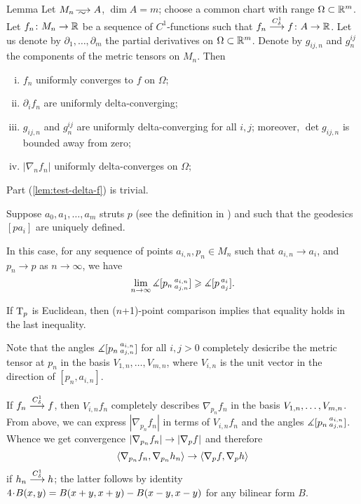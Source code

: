 \begin{thm}{Lemma}\label{lem:test-delta}
Let $M_n\smooths{} A$, $\dim A=m$;
choose a common chart with range $\Omega\subset \mathbb{R}^m$.
Let $f_n\colon M_n\to\mathbb{R}$ be a sequence of $C^1$-functions such that $f_n\zz\smoothto f\:A\to \RR$.
Let us denote by $\partial_1,\dots,\partial_m$ the partial derivatives on $\Omega\subset \mathbb{R}^m$.
Denote by $g_{ij,n}$ and $g^{ij}_n$ the components of the metric tensors on $M_n$.
Then 
\begin{enumerate}[(i)]
\item\label{lem:test-delta-f} $f_n$ uniformly converges to $f$ on $\Omega$;
\item\label{lem:test-delta-partial} $\partial_if_n$ are uniformly delta-converging;
\item\label{lem:test-delta-g}  $g_{ij,n}$ and $g^{ij}_n$ are uniformly delta-converging for all $i,j$;
moreover, $\det g_{ij,n}$ is bounded away from zero;
\item\label{lem:test-delta|nabla|} $|\nabla_n f_n|$ uniformly delta-converges on $\Omega$; %
\end{enumerate}

\end{thm}

Part (\ref{lem:test-delta-f}) is trivial.

Suppose $a_0, a_1,\dots,a_m$ struts $p$ (see the definition in \cite{AKP}) and such that the geodesics $[pa_i]$ are uniquely defined.

In this case, for any sequence of points $a_{i,n}, p_n\in M_n$ such that $a_{i,n}\to a_i$, and $p_n\to p$ as $n\to\infty$, we have
\[\lim_{n\to\infty}\measuredangle [p_n\,{}^{a_{i,n}}_{a_{j,n}}]\geqslant \measuredangle [p\,{}^{a_i}_{a_j}].\]

If $\mathrm{T}_p$ is Euclidean, then ($n$+1)-point comparison implies that equality holds in the last inequality.

Note that the angles $\measuredangle [p_n\,{}^{a_{i,n}}_{a_{j,n}}]$ for all $i,j>0$ completely desicribe the metric tensor at $p_n$ in the basis $V_{1,n},\dots,V_{m,n}$, where $V_{i,n}$ is the unit vector in the direction of $[p_n,a_{i,n}]$.

If $f_n\zz\smoothto f$, then $V_{i,n}f_n$ completely describes $\nabla_{p_n}f_n$ in the basis $V_{1,n},\zz\dots,V_{m,n}$.
From above, we can express $|\nabla_{p_n}f_n|$ in terms of $V_{i,n}f_n$ and the angles $\measuredangle [p_n\,{}^{a_{i,n}}_{a_{j,n}}]$.
Whence we get convergence $|\nabla_{p_n} f_n|\zz\to |\nabla_{p} f|$ and therefore 
\[\langle \nabla_{p_n} f_n,\nabla_{p_n} h_n\rangle\zz\to \langle \nabla_p f,\nabla_p h\rangle\] if $h_n\stackrel{C^1_\delta}{\longrightarrow} h$; the latter follows by identity $4\cdot B(x,y)\zz=B(x\zz+y,x\zz+y)\zz-B(x\zz-y,x\zz-y)$ for any bilinear form $B$.

